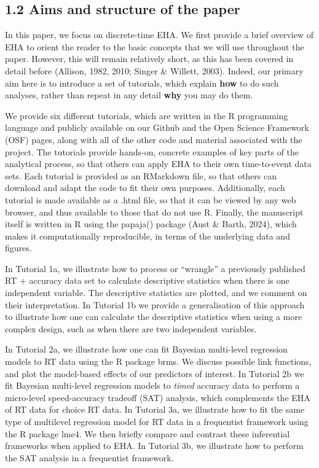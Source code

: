 \documentclass[
  man, donotrepeattitle,floatsintext]{apa6}
\begin{document}
\subsection{1.2 Aims and structure of the paper}\label{aims-and-structure-of-the-paper}

In this paper, we focus on discrete-time EHA. We first provide a brief overview of EHA to orient the reader to the basic concepts that we will use throughout the paper. However, this will remain relatively short, as this has been covered in detail before (Allison, 1982, 2010; Singer \& Willett, 2003). Indeed, our primary aim here is to introduce a set of tutorials, which explain \textbf{how} to do such analyses, rather than repeat in any detail \textbf{why} you may do them.

We provide six different tutorials, which are written in the R programming language and publicly available on our Github and the Open Science Framework (OSF) pages, along with all of the other code and material associated with the project. The tutorials provide hands-on, concrete examples of key parts of the analytical process, so that others can apply EHA to their own time-to-event data sets. Each tutorial is provided as an RMarkdown file, so that others can download and adapt the code to fit their own purposes. Additionally, each tutorial is made available as a .html file, so that it can be viewed by any web browser, and thus available to those that do not use R. Finally, the manuscript itself is written in R using the papaja() package (Aust \& Barth, 2024), which makes it computationally reproducible, in terms of the underlying data and figures.

In Tutorial 1a, we illustrate how to process or ``wrangle'' a previously published RT + accuracy data set to calculate descriptive statistics when there is one independent variable. The descriptive statistics are plotted, and we comment on their interpretation. In Tutorial 1b we provide a generalisation of this approach to illustrate how one can calculate the descriptive statistics when using a more complex design, such as when there are two independent variables.

In Tutorial 2a, we illustrate how one can fit Bayesian multi-level regression models to RT data using the R package brms. We discuss possible link functions, and plot the model-based effects of our predictors of interest. In Tutorial 2b we fit Bayesian multi-level regression models to \emph{timed} accuracy data to perform a micro-level speed-accuracy tradeoff (SAT) analysis, which complements the EHA of RT data for choice RT data. In Tutorial 3a, we illustrate how to fit the same type of multilevel regression model for RT data in a frequentist framework using the R package lme4. We then briefly compare and contrast these inferential frameworks when applied to EHA. In Tutorial 3b, we illustrate how to perform the SAT analysis in a frequentist framework.
\end{document}
